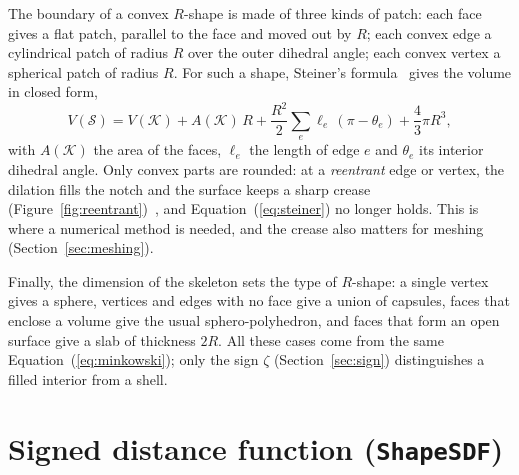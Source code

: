 \documentclass[11pt,a4paper]{article}
\newcommand{\Rmink}{R}                 %
\newcommand{\skel}{\mathcal{K}}        %
\newcommand{\shape}{\mathcal{S}}       %
\newcommand{\sgnsdf}{\zeta}
\begin{document}
The boundary of a convex $R$-shape is made of three kinds of patch: each face
gives a flat patch, parallel to the face and moved out by $\Rmink$; each convex
edge a cylindrical patch of radius $\Rmink$ over the outer dihedral angle; each
convex vertex a spherical patch of radius $\Rmink$. For such a shape, Steiner's
formula~\cite{schneider2014} gives the volume in closed form,
%
\begin{equation}
  V(\shape) = V(\skel) + A(\skel)\,\Rmink
            + \frac{\Rmink^2}{2}\sum_{e}\ell_e\,(\pi-\theta_e)
            + \frac{4}{3}\pi\Rmink^3,
  \label{eq:steiner}
\end{equation}
%
with $A(\skel)$ the area of the faces, $\ell_e$ the length of edge $e$ and
$\theta_e$ its interior dihedral angle. Only convex parts are rounded: at a
\emph{reentrant} edge or vertex, the dilation fills the notch and the surface keeps
a sharp crease (Figure~\ref{fig:reentrant})~\cite{rossignac1986}, and
Equation~(\ref{eq:steiner}) no longer holds. This is where a numerical method is
needed, and the crease also matters for meshing (Section~\ref{sec:meshing}).

Finally, the dimension of the skeleton sets the type of $R$-shape: a single
vertex gives a sphere, vertices and edges with no face give a union of capsules,
faces that enclose a volume give the usual sphero-polyhedron, and faces that form
an open surface give a slab of thickness $2\Rmink$. All these cases come from the
same Equation~(\ref{eq:minkowski}); only the sign $\sgnsdf$
(Section~\ref{sec:sign}) distinguishes a filled interior from a shell.

\section{Signed distance function (\texttt{ShapeSDF})}
\label{sec:sdf}
\end{document}
